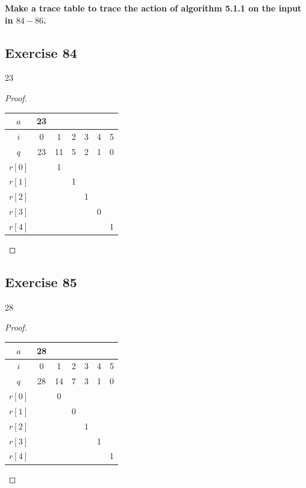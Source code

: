 \documentclass[14pt]{extarticle}
\newcommand{\cy}{\color{cyan}}
\begin{document}
{\bf\cy Make a trace table to trace the action of algorithm 5.1.1 on the input in $84-86$.}

\subsection{Exercise 84}
23
\begin{proof}
\begin{center}
\begin{tabular}{|c|c|c|c|c|c|c|}
\hline
$a$&23&&&&& \\
\hline
$i$&0&1&2&3&4&5 \\
\hline
$q$&23&11&5&2&1&0 \\
\hline
$r[0]$&&1&&&& \\
\hline
$r[1]$&&&1&&& \\
\hline
$r[2]$&&&&1&& \\
\hline
$r[3]$&&&&&0& \\
\hline
$r[4]$&&&&&&1 \\
\hline
\end{tabular}
\end{center}
\end{proof}

\subsection{Exercise 85}
28

\begin{proof}
\begin{center}
\begin{tabular}{|c|c|c|c|c|c|c|}
\hline
$a$&28&&&&& \\
\hline
$i$&0&1&2&3&4&5 \\
\hline
$q$&28&14&7&3&1&0 \\
\hline
$r[0]$&&0&&&& \\
\hline
$r[1]$&&&0&&& \\
\hline
$r[2]$&&&&1&& \\
\hline
$r[3]$&&&&&1& \\
\hline
$r[4]$&&&&&&1 \\
\hline
\end{tabular}
\end{center}
\end{proof}
\end{document}
